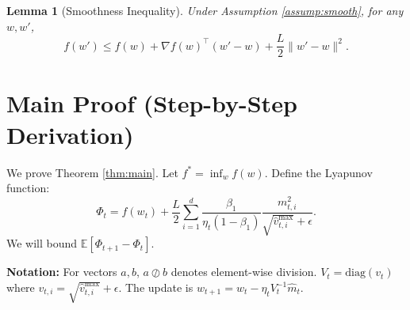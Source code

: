 \documentclass{article}
\newtheorem{lemma}{Lemma}
\begin{document}
\begin{lemma}[Smoothness Inequality] \label{lem:smoothness}
Under Assumption \ref{assump:smooth}, for any $w, w'$,
\begin{equation}
    f(w') \le f(w) + \nabla f(w)^\top (w' - w) + \frac{L}{2} \|w' - w\|^2.
\end{equation}
\end{lemma}

\section*{Main Proof (Step-by-Step Derivation)}

We prove Theorem \ref{thm:main}. Let $f^* = \inf_w f(w)$. Define the Lyapunov function:
\begin{equation}
    \Phi_t = f(w_t) + \frac{L}{2} \sum_{i=1}^d \frac{\beta_1}{\eta_t (1-\beta_1)} \frac{m_{t,i}^2}{\sqrt{\hat{v}_{t,i}^{\text{max}}} + \epsilon}.
\end{equation}
We will bound $\mathbb{E}[\Phi_{t+1} - \Phi_t]$.

\textbf{Notation:} For vectors $a,b$, $a \oslash b$ denotes element-wise division. $V_t = \text{diag}(v_t)$ where $v_{t,i} = \sqrt{\hat{v}_{t,i}^{\text{max}}} + \epsilon$. The update is $w_{t+1} = w_t - \eta_t V_t^{-1} \hat{m}_t$.
\end{document}
